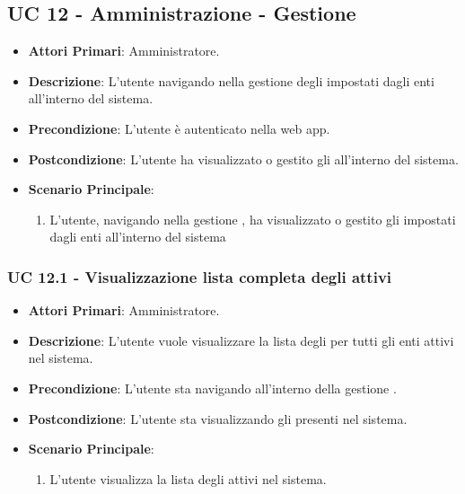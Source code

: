 	\subsection{UC 12 - Amministrazione - Gestione }

		\begin{itemize}
			\item \textbf{Attori Primari}: Amministratore.
			\item \textbf{Descrizione}: L'utente navigando nella gestione degli  impostati dagli enti all'interno del sistema.
			\item \textbf{Precondizione}: L'utente è autenticato nella web app.
			\item \textbf{Postcondizione}: L'utente ha visualizzato o gestito gli  all'interno del sistema.
			\item \textbf{Scenario Principale}:
			\begin{enumerate}
				\item{L'utente, navigando nella gestione , ha visualizzato o gestito gli  impostati dagli enti all'interno del sistema}
			\end{enumerate}	
		\end{itemize}

		\subsubsection{UC 12.1 - Visualizzazione lista completa degli  attivi}
		\begin{itemize}
			\item \textbf{Attori Primari}: Amministratore.
			\item \textbf{Descrizione}: L'utente vuole visualizzare la lista degli  per tutti gli enti attivi nel sistema.
			\item \textbf{Precondizione}: L'utente sta navigando all'interno della gestione .
			\item \textbf{Postcondizione}: L'utente sta visualizzando gli  presenti nel sistema.
			\item \textbf{Scenario Principale}:
			\begin{enumerate}
				\item{L'utente visualizza la lista degli  attivi nel sistema.}
			\end{enumerate}	
		\end{itemize}

